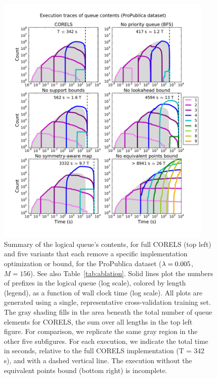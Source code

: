 \begin{figure}[t!]
\begin{center}
\includegraphics[trim={15mm 20mm 5mm 25mm},
width=0.94\textwidth]{figs/kdd_compas_ablation-queue.pdf}
\end{center}
\vspace{-5mm}
\caption{Summary of the logical queue's contents, for full CORELS (top left)
and five variants that each remove a specific implementation optimization or bound,
for the ProPublica dataset (${{\lambda} = 0.005}$, ${M = 156}$).  See also Table~\ref{tab:ablation}.
%
%
Solid lines plot the numbers of prefixes in the logical queue (log scale), colored by length (legend),
as a function of wall clock time (log scale).
%
All plots are generated using a single, representative cross-validation training set.
%
%
The gray shading fills in the area beneath the total number of
queue elements for CORELS,
\ie the sum over all lengths in the top left figure.
%
For comparison, we replicate the same gray region
in the other five subfigures.
%
For each execution, we indicate the total time in seconds,
relative to the full CORELS implementation (T = 342 s),
and with a dashed vertical line.
%
The execution without the equivalent points bound (bottom right) is incomplete.
}
\label{fig:queue}
\end{figure}

